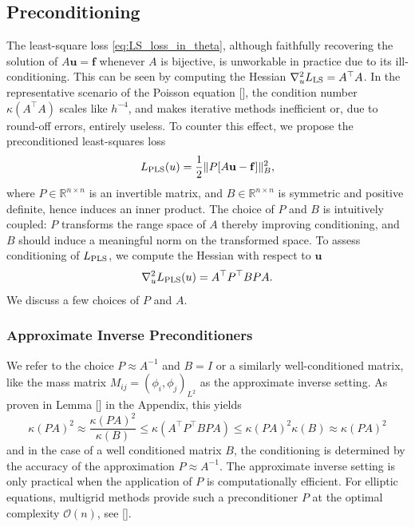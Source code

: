 \documentclass{article} %
\begin{document}
\subsection{Preconditioning} %
The least-square loss \ref{eq:LS_loss_in_theta}, although faithfully recovering the solution of $A\mathbf u = \mathbf f$ whenever $A$ is bijective, is unworkable in practice due to its ill-conditioning. This can be seen by computing the Hessian $\nabla_u^2 L_{\textup{LS}}=A^\top A$. In the representative scenario of the Poisson equation [], the condition number $\kappa(A^\top A)$ scales like $h^{-4}$, and makes iterative methods inefficient or, due to round-off errors, entirely useless. To counter this effect, we propose the preconditioned least-squares loss
\begin{equation}
   L_{\textup{PLS}}(u) = \frac12 \| P[A\mathbf u - \mathbf f] \|_B^2,
\end{equation}
where $P\in\mathbb R^{n\times n}$ is an invertible matrix, and $B\in\mathbb R^{n\times n}$ is symmetric and positive definite, hence induces an inner product. The choice of $P$ and $B$ is intuitively coupled: $P$ transforms the range space of $A$ thereby improving conditioning, and $B$ should induce a meaningful norm on the transformed space. To assess conditioning of $L_{\textup{PLS}}$, we compute the Hessian with respect to $\mathbf u$
\begin{equation}
   \nabla^2_u L_{\textup{PLS}}(u) = A^\top P^\top B P A.
\end{equation}
We discuss a few choices of $P$ and $A$.

\subsubsection{Approximate Inverse Preconditioners}\label{sec:approximate_inverse_preconditioner} We refer to the choice $P\approx A^{-1}$ and $B=I$ or a similarly well-conditioned matrix, like the mass matrix $M_{ij}=(\phi_i,\phi_j)_{L^2}$ as the approximate inverse setting. As proven in Lemma [] in the Appendix, this yields
\begin{equation*}
   \kappa(PA)^2 
   \approx
   \frac{\kappa(PA)^2}{\kappa(B)}
   \leq
   \kappa(A^\top P^\top B P A) 
   \leq 
   \kappa(PA)^2\kappa(B)
   \approx 
   \kappa(PA)^2
\end{equation*}
and in the case of a well conditioned matrix $B$, the conditioning is determined by the accuracy of the approximation $P\approx A^{-1}$. The approximate inverse setting is only practical when the application of $P$ is computationally efficient. For elliptic equations, multigrid methods provide such a preconditioner $P$ at the optimal complexity $\mathcal O(n)$, see [].
\end{document}
